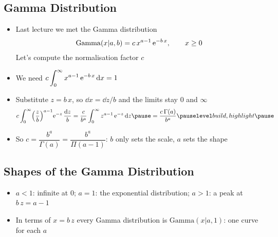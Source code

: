 \begin{slide}
\section[-2]{Gamma Distribution}

\begin{PauseHighLight}
  \begin{itemize}
  \item Last lecture we met the Gamma distribution
    \begin{align*}
      \mathrm{Gamma}(x|a,b) = c\,x^{a-1}\,{\rm e}^{-b\,x}, \qquad x\geq0
    \end{align*}
    Let's compute the normalisation factor $c$\pause
  \item We need $\displaystyle c\int_0^\infty x^{a-1}\,{\rm e}^{-b\,x}\,\mathrm{d} x = 1$\pause
  \item Substitute $z = b\,x$, so $\dd x = \dd z/b$ and the limits stay
    $0$ and $\infty$
    \begin{align*}
      c\int_0^\infty \Bigl(\frac{z}{b}\Bigr)^{a-1}\e{-z}\,\frac{\dd z}{b}
      = \frac{c}{b^a}\int_0^\infty z^{a-1}\,\e{-z}\,\dd z\pause
      = \frac{c\,\Gamma(a)}{b^a}\pauseb
    \end{align*}
  \item So $c = \dfrac{b^a}{\Gamma(a)} = \dfrac{b^a}{\Pi(a-1)}$\pause{}: $b$
    only sets the scale, $a$ sets the shape\pauseb
  \end{itemize}
\end{PauseHighLight}

\end{slide}

\begin{slide}
\section[-2]{Shapes of the Gamma Distribution}

\pb\pause{}
\begin{center}
  \pause
\end{center}
\begin{itemize}
\item $a<1$: infinite at $0$;\pauseh{} $a=1$: the exponential
  distribution;\pauseh{} $a>1$: a peak at $b\,z = a-1$\pauseh{}
\item In terms of $x = b\,z$ every Gamma distribution is
  $\mathrm{Gamma}(x|a,1)$: one curve for each $a$\pauseh
\end{itemize}

\end{slide}

